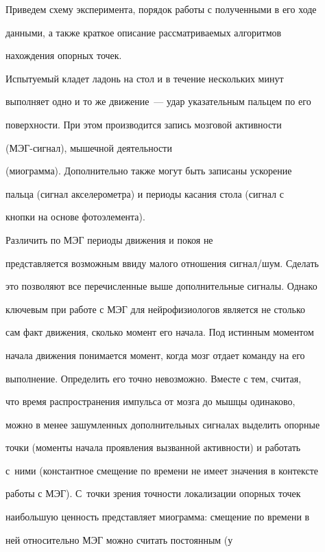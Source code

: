Приведем схему эксперимента, порядок работы с полученными в его ходе


данными, а также краткое описание рассматриваемых алгоритмов


нахождения опорных точек.





Испытуемый кладет ладонь на стол и в течение нескольких минут


выполняет одно и то же движение~--- удар указательным пальцем по его


поверхности. При этом производится запись мозговой активности


(МЭГ-сиг\-нал), мышечной деятельности


(миограмма). Дополнительно также могут быть записаны ускорение


пальца (сигнал акселерометра) и периоды касания стола (сигнал с


кнопки на основе фотоэлемента).





Различить по МЭГ периоды движения и покоя не


представляется возможным ввиду малого отношения сигнал/шум. Сделать


это позволяют все перечисленные выше дополнительные сигналы. Однако


ключевым при работе с МЭГ для нейрофизиологов является не столько


сам факт движения, сколько момент его начала. Под истинным моментом


начала движения понимается момент, когда мозг отдает команду на его


выполнение. Определить его точно невозможно. Вместе с тем, считая,


что время распространения импульса от мозга до мышцы одинаково,


можно в менее зашумленных дополнительных сигналах выделить опорные


точки (моменты начала проявления вызванной активности) и работать


с~ними (константное смещение по времени не имеет значения в контексте


работы с МЭГ). С~точки зрения точности локализации опорных точек


наибольшую ценность представляет миограмма: смещение по времени в


ней относительно МЭГ можно считать постоянным (у


